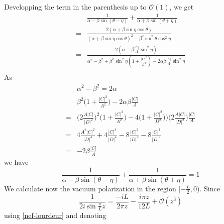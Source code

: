 Developping the term in the parenthesis up to $\mathcal{O}(1)$, we get
\begin{equation}
\begin{split}
& \frac{1}{\alpha - \beta \sin (\theta - \eta)}
   + \frac{1}{\alpha + \beta \sin (\theta + \eta)} \\
= & \frac{2(\alpha + \beta \sin \eta \cos \theta)}{(\alpha + \beta \sin \eta \cos \theta)^2 - \beta^2 \sin^2 \theta \cos^2 \eta} \\
= & \frac{2(\alpha - \beta \frac{|C|}{A} \sin^2 \eta)}{\alpha^2 - \beta^2 + \beta^2 \sin^2 \eta (1 + \frac{|C|^2}{A^2}) - 2 \alpha \beta \frac{|C|}{A} \sin^2 \eta} \\
\end{split}
\end{equation}
As
\begin{equation*}
\begin{split}
& \alpha^2 - \beta ^ 2 = 2 \alpha \\
&  \beta^2 \big(1 + \frac{|C|^2}{A^2} \big) - 2 \alpha \beta \frac{|C|}{A} \\
= & \big(2\frac{A |C|}{|D|^2} \big)^2 \big( 1+ \frac{|C|^2}{A^2} \big) - 4\big( 1+ \frac{|C|^2}{D^2}))\big(2\frac{A |C|}{|D|^2} \big) \frac{|C|}{A}  \\
= & 4 \frac{A^2 |C|^2}{|D|^4} + 4\frac{|C|^4}{|D|^4} - 8\frac{|C|^2}{|D|^2} - 8\frac{|C|^4}{|D|^4} \\
= & -2 \beta \frac{|C|}{A}
\end{split}
\end{equation*}
we have
\begin{equation}\label{nef-lourdeur}
\frac{1}{\alpha - \beta \sin (\theta - \eta)}
   + \frac{1}{\alpha + \beta \sin (\theta + \eta)} 
= 1
\end{equation}
We calculate now the vacuum polarization in the region $[-\frac{L}{2}, 0)$. Since
\begin{equation*}
\frac{1}{2i \sin \frac{\pi}{L}z } = \frac{-iL}{2 \pi z} - \frac{i \pi z}{12L} + \mathcal{O}(z^3) 
\end{equation*}
using \cref{nef-lourdeur} and denoting
